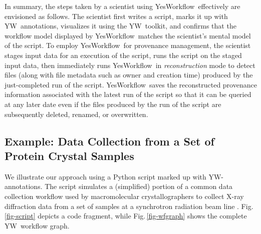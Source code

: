 \documentclass[nocopyrightspace]{sigplanconf}
\newcommand{\figref}[1]{Fig.\,\ref{#1}}
\newcommand{\YW}{\textsf{YesWorkflow}}
\newcommand{\yw}{\textsf{YW}}
\begin{document}
In summary, the steps taken by a scientist using \YW\ effectively are envisioned
as follows.
The scientist first writes a script, marks it up with \yw\ annotations, 
visualizes it using the \yw\ toolkit, and confirms that the workflow model 
displayed by \YW\ matches the scientist's mental model of the script.
To employ \YW\ for provenance management, the scientist stages input data 
for an execution of the script, runs the script on the staged input data, then
immediately runs \YW\ in \emph{reconstruction} mode to detect files 
(along with file metadata such as owner and creation time) 
produced by the just-completed run of the script. \YW\ saves
the reconstructed provenance information associated with the latest run of the script
so that it can be queried at any later date even if the files produced by the
run of the script are subsequently deleted, renamed, or overwritten.




\subsection{Example: Data Collection from a Set of Protein Crystal
  Samples}
We illustrate our approach using a Python script marked up with
\yw-annotations.  The script simulates a (simplified) portion of 
a common data collection workflow used by macromolecular crystallographers to
collect X-ray diffraction data from a set of samples at a synchrotron
radiation beam line \protect\cite{tsai2013autodrug}.
\figref{fig-script} depicts a code fragment, while
\figref{fig-wfgraph} shows the complete \yw\ workflow graph.
\end{document}
